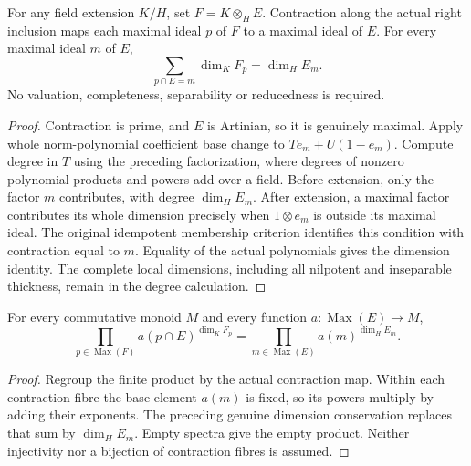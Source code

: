 \begin{theorem}
\label{algebra:local-dimension-base-change}
\leanok
{}
For any field extension $K/H$, set $F=K\otimes_HE$. Contraction along the
actual right inclusion maps each maximal ideal $p$ of $F$ to a maximal
ideal of $E$. For every maximal ideal $m$ of $E$,
\[
 \sum_{p\cap E=m}\dim_KF_p=\dim_HE_m.
\]
No valuation, completeness, separability or reducedness is required.
\end{theorem}
\begin{proof}
Contraction is prime, and $E$ is Artinian, so it is genuinely maximal.
Apply whole norm-polynomial coefficient base change to
$Te_m+U(1-e_m)$. Compute degree in $T$ using the preceding factorization,
where degrees of nonzero polynomial products and powers add over a field.
Before extension, only the factor $m$ contributes, with degree $\dim_HE_m$.
After extension, a maximal factor contributes its whole dimension precisely
when $1\otimes e_m$ is outside its maximal ideal. The original idempotent
membership criterion identifies this condition with contraction equal to
$m$. Equality of the actual polynomials gives the dimension identity.
The complete local dimensions, including all nilpotent and inseparable
thickness, remain in the degree calculation.
\end{proof}

\begin{theorem}
\label{algebra:finite-factor-weighted-products}
\leanok
{}
For every commutative monoid $M$ and every function
$a:\operatorname{Max}(E)\to M$,
\[
 \prod_{p\in\operatorname{Max}(F)}a(p\cap E)^{\dim_KF_p}
 =\prod_{m\in\operatorname{Max}(E)}a(m)^{\dim_HE_m}.
\]
\end{theorem}
\begin{proof}
Regroup the finite product by the actual contraction map. Within each
contraction fibre the base element $a(m)$ is fixed, so its powers multiply
by adding their exponents. The preceding genuine dimension conservation
replaces that sum by $\dim_HE_m$. Empty spectra give the empty product.
Neither injectivity nor a bijection of contraction fibres is assumed.
\end{proof}

